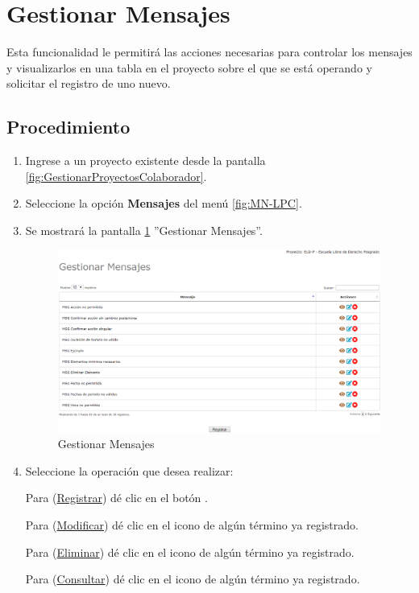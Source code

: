 \hypertarget{cv:GestionarGlosario}{\section{Gestionar Mensajes}} \label{sec:GestionarMensajes}

	Esta funcionalidad le permitirá las acciones necesarias para controlar los mensajes y visualizarlos en una tabla en el proyecto sobre el que se está operando y solicitar el registro de uno nuevo.

		\subsection{Procedimiento}

			\begin{enumerate}
				
			\item Ingrese a un proyecto existente desde la pantalla \ref{fig:GestionarProyectosColaborador}.
	
			\item Seleccione la opción \textbf{Mensajes} del menú \ref{fig:MN-LPC}.
	
			\item Se mostrará la pantalla \ref{fig:GestionarMensajes} ''Gestionar Mensajes''.

			\begin{figure}[h!]
				\begin{center}
					\includegraphics[scale=0.5]{roles/lider/mensajes/pantallas/IU9gestionarMensajes}
					\caption{Gestionar Mensajes}
					\label{fig:GestionarMensajes}
				\end{center}
			\end{figure}
		
				\item Seleccione la operación que desea realizar:
			
			Para (\hyperlink{cv:registrarMensaje}{Registrar}) dé clic en el botón \IURegistrar.
			
			Para (\hyperlink{cv:modificarTermino}{Modificar}) dé clic en el icono \IUEditar{} de algún término ya registrado.
			
			Para (\hyperlink{cv:eliminarProyecto}{Eliminar}) dé clic en el icono \IUBotonEliminar{} de algún término ya registrado.
			
			Para (\hyperlink{cv:consultarTermino}{Consultar}) dé clic en el icono \IUConsultar{} de algún término ya registrado.
			\end{enumerate}